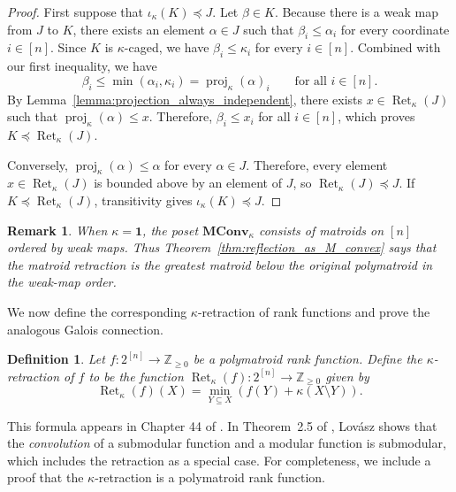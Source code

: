\documentclass[10pt,a4paper]{amsart}
\newtheorem{definition}[theorem]{Definition}
\newtheorem{remark}[theorem]{Remark}
\newcommand{\Zgeq}{\mathbb{Z}_{\geq 0}}       %
\newcommand{\ones}{\textbf{1}}
\newcommand{\MConvK}{\mathbf{MConv}_\kappa}
\DeclareMathOperator{\proj}{proj}              %
\newcommand{\kproj}{\proj_{\kappa}}            %
\DeclareMathOperator{\Ret}{Ret}                %
\newcommand{\RetK}{\Ret_{\kappa}}              %
\begin{document}
\begin{proof}
    First suppose that $\iota_\kappa(K)\preceq J$. Let $\beta\in K$.
    Because there is a weak map from $J$ to $K$, there exists an element
    $\alpha\in J$ such that $\beta_i\leq\alpha_i$ for every coordinate
    $i\in[n]$. Since $K$ is $\kappa$-caged, we have
    $\beta_i\leq\kappa_i$ for every $i\in[n]$. Combined with our first
    inequality, we have
    \[
        \beta_i
        \leq
        \min(\alpha_i,\kappa_i)
        =
        \kproj(\alpha)_i
        \qquad\text{for all }i\in[n].
    \]
    By Lemma~\ref{lemma:projection_always_independent}, there exists
    $x\in\RetK(J)$ such that $\kproj(\alpha)\leq x$. Therefore,
    $\beta_i\leq x_i$ for all $i\in[n]$, which proves
    $K\preceq\RetK(J)$.

    Conversely, $\kproj(\alpha)\leq\alpha$ for every $\alpha\in J$.
    Therefore, every element $x\in\RetK(J)$ is bounded above by an element
    of $J$, so $\RetK(J)\preceq J$. If
    $K\preceq\RetK(J)$, transitivity gives
    $\iota_\kappa(K)\preceq J$.
\end{proof}

\begin{remark}
    When $\kappa=\ones$, the poset $\MConvK$ consists of matroids on $[n]$
    ordered by weak maps. Thus Theorem~\ref{thm:reflection_as_M_convex}
    says that the matroid retraction is the greatest matroid below the
    original polymatroid in the weak-map order.
\end{remark}

We now define the corresponding $\kappa$-retraction of rank functions and
prove the analogous Galois connection.

\begin{definition}\label{def:rank_function_retraction}
    Let $f\colon 2^{[n]}\to\Zgeq$ be a polymatroid rank function. Define the
    \emph{$\kappa$-retraction} of $f$ to be the function
    $\RetK(f)\colon 2^{[n]}\to\Zgeq$ given by
    \[
        \RetK(f)(X)
        =
        \min_{Y\subseteq X}
        \left(f(Y)+\kappa(X\setminus Y)\right).
    \]
\end{definition}

This formula appears in Chapter 44 of
\cite{schrijver2003combinatorialB}. In Theorem~2.5 of \cite{Lovasz1983},
Lov\'asz shows that the \emph{convolution} of a submodular function and a
modular function is submodular, which includes the retraction as a special
case. For completeness, we include a proof that the $\kappa$-retraction is
a polymatroid rank function.
\end{document}
